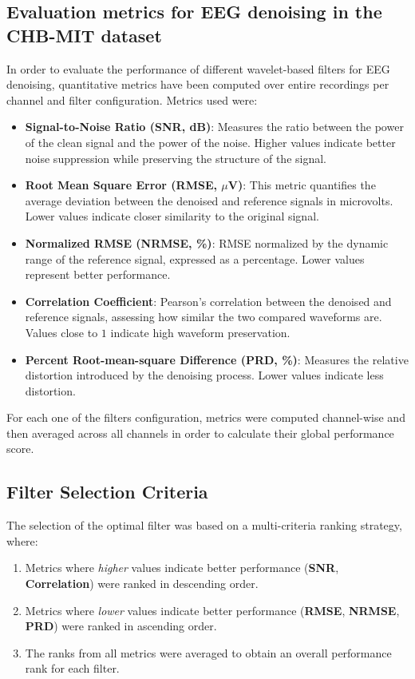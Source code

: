 \documentclass{article}
\begin{document}
			\subsection{Evaluation metrics for EEG denoising in the CHB-MIT dataset}

			In order to evaluate the performance of 
			different wavelet-based filters for EEG denoising, 
			quantitative metrics have been computed over entire recordings 
			per channel and filter configuration. 
			Metrics used were:

			\begin{itemize}
			    \item \textbf{Signal-to-Noise Ratio (SNR, dB)}: Measures the ratio between the power of the clean 
				    signal and the power of the noise. Higher values indicate better noise suppression 
				    while preserving the structure of the signal.
			    \item \textbf{Root Mean Square Error (RMSE, $\mu$V)}: This metric quantifies 
				    the average deviation between the denoised and reference signals in microvolts. 
					Lower values indicate closer similarity to the original signal.
			    \item \textbf{Normalized RMSE (NRMSE, \%)}: RMSE normalized by the dynamic range of the 
				    reference signal, expressed as a percentage. 
					Lower values represent better performance.
			    \item \textbf{Correlation Coefficient}: Pearson's correlation between the denoised and 
				    reference signals, assessing how similar the two compared waveforms are.
					Values close to $1$ indicate high waveform preservation.
			    \item \textbf{Percent Root-mean-square Difference (PRD, \%)}: Measures the relative distortion 
				    introduced by the denoising process. 
					Lower values indicate less distortion.
			\end{itemize}

			For each one of the filters configuration, metrics were computed 
			channel-wise and then averaged across all channels in order to
			calculate their global performance score. 

			\subsection{Filter Selection Criteria}

			The selection of the optimal filter was based on a multi-criteria ranking strategy, where:
			\begin{enumerate}
			    \item Metrics where \textit{higher} values indicate better performance (\textbf{SNR}, \textbf{Correlation}) were ranked in descending order.
			    \item Metrics where \textit{lower} values indicate better performance (\textbf{RMSE}, \textbf{NRMSE}, \textbf{PRD}) were ranked in ascending order.
			    \item The ranks from all metrics were averaged to obtain an overall performance rank for each filter.
			\end{enumerate}
\end{document}
